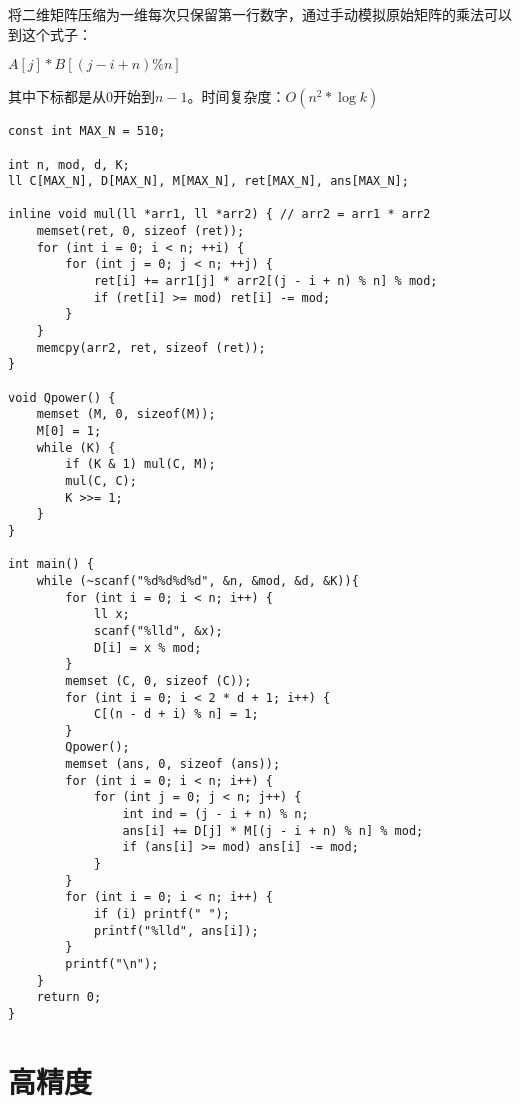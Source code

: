 将二维矩阵压缩为一维每次只保留第一行数字，通过手动模拟原始矩阵的乘法可以到这个式子： \\
\begin{center}
$A[j]*B[(j-i+n)\%n]$
\end{center}
其中下标都是从0开始到$n-1$。时间复杂度：$O(n^{2}*\log k)$
\begin{lstlisting}
const int MAX_N = 510;

int n, mod, d, K;
ll C[MAX_N], D[MAX_N], M[MAX_N], ret[MAX_N], ans[MAX_N];

inline void mul(ll *arr1, ll *arr2) { // arr2 = arr1 * arr2
    memset(ret, 0, sizeof (ret));
    for (int i = 0; i < n; ++i) {
        for (int j = 0; j < n; ++j) {
            ret[i] += arr1[j] * arr2[(j - i + n) % n] % mod;
            if (ret[i] >= mod) ret[i] -= mod;
        }
    }
    memcpy(arr2, ret, sizeof (ret));
}

void Qpower() {
    memset (M, 0, sizeof(M));
    M[0] = 1;
    while (K) {
        if (K & 1) mul(C, M);
        mul(C, C);
        K >>= 1;
    }
}

int main() {
    while (~scanf("%d%d%d%d", &n, &mod, &d, &K)){
        for (int i = 0; i < n; i++) {
            ll x;
            scanf("%lld", &x);
            D[i] = x % mod;
        }
        memset (C, 0, sizeof (C));
        for (int i = 0; i < 2 * d + 1; i++) {
            C[(n - d + i) % n] = 1;
        }
        Qpower();
        memset (ans, 0, sizeof (ans));
        for (int i = 0; i < n; i++) {
            for (int j = 0; j < n; j++) {
                int ind = (j - i + n) % n;
                ans[i] += D[j] * M[(j - i + n) % n] % mod;
                if (ans[i] >= mod) ans[i] -= mod;
            }
        }
        for (int i = 0; i < n; i++) {
            if (i) printf(" ");
            printf("%lld", ans[i]);
        }
        printf("\n");
    }
    return 0;
}
\end{lstlisting}

\section{高精度}


